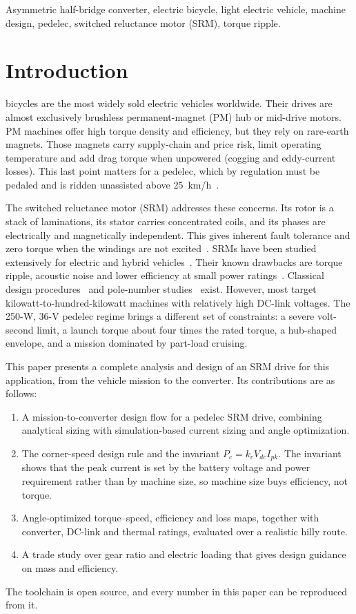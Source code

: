 \documentclass[journal]{IEEEtran}
\begin{document}
\begin{IEEEkeywords}
Asymmetric half-bridge converter, electric bicycle, light electric vehicle,
machine design, pedelec, switched reluctance motor (SRM), torque ripple.
\end{IEEEkeywords}

\section{Introduction}
 bicycles are the most widely sold electric vehicles
worldwide. Their drives are almost exclusively brushless permanent-magnet (PM)
hub or mid-drive motors. PM machines offer high torque density and
efficiency, but they rely on rare-earth magnets. Those magnets carry supply-chain and price
risk, limit operating temperature and add drag torque when unpowered (cogging
and eddy-current losses). This last point matters for a pedelec,
which by regulation must be pedaled and is ridden unassisted above
25~km/h~\cite{en15194}.

The switched reluctance motor (SRM) addresses these concerns. Its rotor is a
stack of laminations, its stator carries concentrated coils, and its phases
are electrically and magnetically independent. This gives inherent fault
tolerance and zero torque when the windings are not excited~\cite{miller1993,krishnan2001}.
SRMs have been studied extensively for electric and hybrid
vehicles~\cite{rahman2000,xue2010,jiang2017,bilgin2019}. Their known drawbacks
are torque ripple, acoustic noise and lower efficiency at small power
ratings~\cite{husain2002,vujicic2012}. Classical design procedures~\cite{krishnan1988,radun1995,vijayakumar2008}
and pole-number studies~\cite{bilgin2012} exist. However, most target
kilowatt-to-hundred-kilowatt machines with relatively high DC-link voltages.
The \mbox{250-W}, 36-V pedelec regime brings a different set of constraints:
a severe volt-second limit, a launch torque about four times the rated torque, a
hub-shaped envelope, and a mission dominated by part-load cruising.

This paper presents a complete analysis and design of an SRM drive for this
application, from the vehicle mission to the converter. Its contributions are as follows:
\begin{enumerate}
\item A mission-to-converter design flow for a pedelec SRM drive, combining
analytical sizing with simulation-based current sizing and angle optimization.
\item The corner-speed design rule and the invariant $P_c=k_cV_{dc}I_{pk}$.
The invariant shows that the peak current is set by the battery voltage and
power requirement rather than by machine size, so machine size buys efficiency, not torque.
\item Angle-optimized torque--speed, efficiency and loss maps, together with
converter, DC-link and thermal ratings, evaluated over a realistic hilly route.
\item A trade study over gear ratio and electric loading that gives design
guidance on mass and efficiency.
\end{enumerate}
The toolchain is open source, and every number in this paper can be reproduced
from it.
\end{document}
